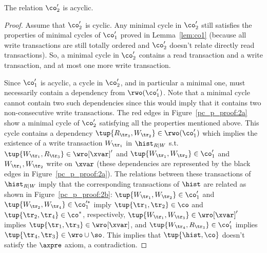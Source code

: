  
 \begin{lemma}\label{lem:co2:app}
 The relation $\co'_2$ is acyclic.
 \end{lemma}
 \begin{proof}
 Assume that $\co'_2$ is cyclic. Any minimal cycle in $\co'_2$ still satisfies the properties of minimal cycles of $\co'_1$ proved in Lemma~\ref{lem:co1} (because all write transactions are still totally ordered and $\co'_2$ doesn't relate directly read transactions). 
 So, a minimal cycle in $\co'_2$ contains a read transaction and a write transaction, and at most one more write transaction.
 
 Since $\co'_1$ is acyclic, a cycle in $\co'_2$, and in particular a minimal one, must  necessarily contain a dependency from $\rwo(\co'_1)$. Note that a minimal cycle cannot contain two such dependencies since this would imply that it contains two non-consecutive write transactions. 
% 
The red edges in Figure~\ref{pc_p_proof:2a} show a minimal cycle of $\co'_2$ satisfying all the properties mentioned above. This cycle contains a dependency $\tup{R_{\tr_3}, W_{\tr_2}}\in \rwo(\co'_1)$ which implies the existence of a write transaction $W_{\tr_1}$ in $\hist_{R|W}$ s.t. $\tup{W_{\tr_1}, R_{\tr_3}} \in \wro[\xvar]'$ and $\tup{W_{\tr_1}, W_{\tr_2}} \in \co'_1$ and $W_{\tr_1}, W_{\tr_2}$ write on $\xvar$ (these dependencies are represented by the black edges in Figure~\ref{pc_p_proof:2a}). The relations between these transactions of $\hist_{R|W}$ imply that the corresponding transactions of $\hist$ are related as shown in Figure~\ref{pc_p_proof:2b}: $\tup{W_{\tr_1}, W_{\tr_2}} \in \co'_1$ and $\tup{W_{\tr_2}, W_{\tr_4}} \in \co'^*_1$ imply $\tup{\tr_1, \tr_2} \in \co$ and $\tup{\tr_2, \tr_4} \in \co^*$, respectively, $\tup{W_{\tr_1}, W_{\tr_3}} \in \wro[\xvar]'$ implies $\tup{\tr_1, \tr_3} \in \wro[\xvar]$, and $\tup{W_{\tr_4}, R_{\tr_3}} \in \co'_1$ implies $\tup{\tr_4, \tr_3} \in \wro \cup \so$. This implies that $\tup{\hist,\co}$ doesn't satisfy the $\axpre$ axiom, a contradiction.
  \end{proof}
 
